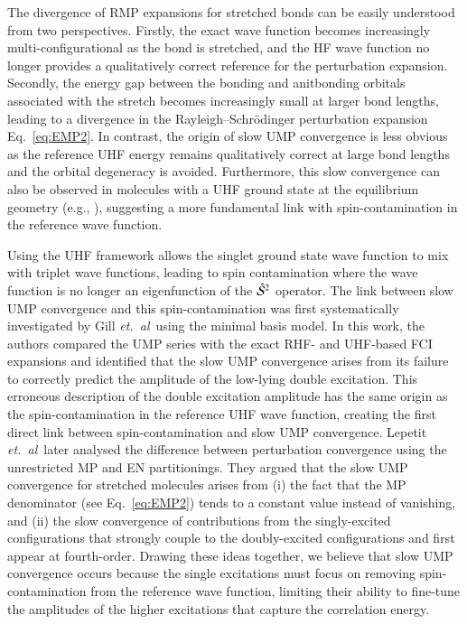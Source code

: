 \documentclass[aps,prb,reprint,noshowkeys,linenumbers,superscriptaddress]{revtex4-1}
\newcommand{\hugh}[1]{\textcolor{hughgreen}{#1}}
\newcommand{\latin}[1]{#1}
\newcommand{\eg}{\latin{e.g.}}
\newcommand{\etal}{\textit{et.\ al}}
\newcommand{\cS}{\mathcal{S}}
\begin{document}
\hugh{%
The divergence of RMP expansions for stretched bonds can be easily understood from two perspectives.\cite{Gill_1988a}
Firstly, the exact wave function becomes increasingly multi-configurational as the bond is stretched, and the 
HF wave function no longer provides a qualitatively correct reference for the perturbation expansion.
Secondly, the energy gap between the bonding and anitbonding orbitals associated with the stretch becomes
increasingly small at larger bond lengths, leading to a divergence in the Rayleigh--Schr\"odinger perturbation
expansion Eq.~\eqref{eq:EMP2}.
In contrast, the origin of slow UMP convergence is less obvious as the reference UHF energy remains
qualitatively correct at large bond lengths and the orbital degeneracy is avoided.
Furthermore, this slow convergence can also be observed in molecules with a UHF ground state at the equilibrium
geometry (\eg, \ce{CN^{-}}), suggesting a more fundamental link with spin-contamination 
in the reference wave function.\cite{Nobes_1987}
}

\hugh{%
Using the UHF framework allows} the singlet ground state wave function to mix with triplet wave functions, 
leading to \hugh{spin contamination where the wave function is no longer an eigenfunction of the $\Hat{\cS}^2$ operator.}
\hugh{The link between slow UMP convergence and this spin-contamination was first systematically investigated} 
by Gill \etal\ using the minimal basis  model.\cite{Gill_1988}
\hugh{In this work, the authors compared the UMP series with the exact RHF- and UHF-based FCI expansions
and identified that the slow UMP convergence arises from its failure to correctly predict the amplitude of the
low-lying double excitation.
This erroneous description of the double excitation amplitude has the same origin as the spin-contamination in the reference
UHF wave function, creating the first direct link between spin-contamination and slow UMP convergence.\cite{Gill_1988}
Lepetit \etal\ later analysed the difference between perturbation convergence using the unrestricted MP 
and EN partitionings.\cite{Lepetit_1988}
They argued that the slow UMP convergence for stretched molecules arises from 
(i) the fact that the MP denominator (see Eq.~\ref{eq:EMP2})
tends to a constant value instead of vanishing, and (ii) the slow convergence of contributions from the 
singly-excited configurations that strongly couple to the doubly-excited configurations and first
appear at fourth-order.\cite{Lepetit_1988}
Drawing these ideas together, we believe that slow UMP convergence occurs because the single excitations must focus on removing
spin-contamination from the reference wave function, limiting their ability to fine-tune the amplitudes of the higher 
excitations that capture the correlation energy.
}
\end{document}
